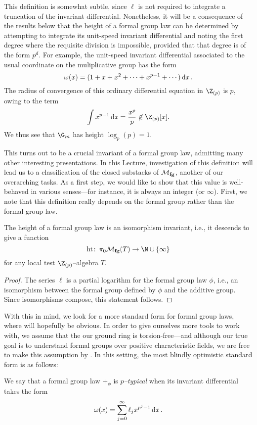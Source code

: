 \begin{example}
This definition is somewhat subtle, since \(\ell\) is not required to integrate a truncation of the invariant differential.  Nonetheless, it will be a consequence of the results below that the height of a formal group law can be determined by attempting to integrate its unit-speed invariant differential and noting the first degree where the requisite division is impossible, provided that that degree is of the form \(p^d\).  For example, the unit-speed invariant differential associated to the usual coordinate on the muliplicative group has the form \[\omega(x) = (1 + x + x^2 + \cdots + x^{p-1} + \cdots) \operatorname{d\mathit{x}}.\]  The radius of convergence of this ordinary differential equation in \(\Z_{(p)}\) is \(p\), owing to the term \[\int x^{p-1} \dx = \frac{x^p}{p} \not\in \Z_{(p)}[x].\]  We thus see that \(\G_m\) has height \(\log_p(p) = 1\).
\end{example}

This turns out to be a crucial invariant of a formal group law, admitting many other interesting presentations.  In this Lecture, investigation of this definition will lead us to a classification of the closed substacks of \(\mathcal{M}_{\mathbf{fg}}\), another of our overarching tasks.  As a first step, we would like to show that this value is well-behaved in various senses---for instance, it is always an integer (or \(\infty\)).  First, we note that this definition really depends on the formal group rather than the formal group law.

\begin{lemma}\label{HeightIsAnIsomInvariant}
The height of a formal group law is an isomorphism invariant, i.e., it descends to give a function \[\height\co \pi_0 \moduli{fg}(T) \to \N \cup \{\infty\}\] for any local test \(\Z_{(p)}\)--algebra \(T\).
\end{lemma}
\begin{proof}
The series \(\ell\) is a partial logarithm for the formal group law \(\phi\), i.e., an isomorphism between the formal group defined by \(\phi\) and the additive group.  Since isomorphisms compose, this statement follows.
\end{proof}

With this in mind, we look for a more standard form for formal group laws, where  will hopefully be obvious.  In order to give ourselves more tools to work with, we assume that the our ground ring is torsion-free---and although our true goal is to understand formal groups over positive characteristic fields, we are free to make this assumption by .  In this setting, the most blindly optimistic standard form is as follows:
\begin{definition}\label{DefnPTypInvDiffl}
We say that a formal group law \(+_\phi\) is \textit{\(p\)--typical} when its invariant differential takes the form \[\omega(x) = \sum_{j=0}^\infty \ell_j x^{p^j-1} \operatorname{d\mathit{x}}.\]
\end{definition}

